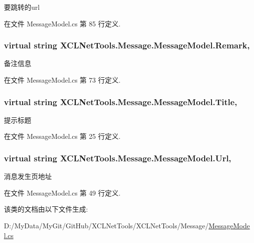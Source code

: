 要跳转的url 



在文件 Message\-Model.\-cs 第 85 行定义.

\hypertarget{class_x_c_l_net_tools_1_1_message_1_1_message_model_a933d98b3a93f2aefeaaf2d66940133a9}{
\subsubsection[{Remark}]{\setlength{\rightskip}{0pt plus 5cm}virtual string X\-C\-L\-Net\-Tools.\-Message.\-Message\-Model.\-Remark\hspace{0.3cm}{\ttfamily [get]}, {\ttfamily [set]}}}\label{class_x_c_l_net_tools_1_1_message_1_1_message_model_a933d98b3a93f2aefeaaf2d66940133a9}


备注信息 



在文件 Message\-Model.\-cs 第 73 行定义.

\hypertarget{class_x_c_l_net_tools_1_1_message_1_1_message_model_a2347b5cf1ac7736de79aa94abd252d85}{
\subsubsection[{Title}]{\setlength{\rightskip}{0pt plus 5cm}virtual string X\-C\-L\-Net\-Tools.\-Message.\-Message\-Model.\-Title\hspace{0.3cm}{\ttfamily [get]}, {\ttfamily [set]}}}\label{class_x_c_l_net_tools_1_1_message_1_1_message_model_a2347b5cf1ac7736de79aa94abd252d85}


提示标题 



在文件 Message\-Model.\-cs 第 25 行定义.

\hypertarget{class_x_c_l_net_tools_1_1_message_1_1_message_model_a35cd14fdd9bbc8dea4c151c00d538755}{
\subsubsection[{Url}]{\setlength{\rightskip}{0pt plus 5cm}virtual string X\-C\-L\-Net\-Tools.\-Message.\-Message\-Model.\-Url\hspace{0.3cm}{\ttfamily [get]}, {\ttfamily [set]}}}\label{class_x_c_l_net_tools_1_1_message_1_1_message_model_a35cd14fdd9bbc8dea4c151c00d538755}


消息发生页地址 



在文件 Message\-Model.\-cs 第 49 行定义.



该类的文档由以下文件生成\-:\begin{DoxyCompactItemize}
\item 
D\-:/\-My\-Data/\-My\-Git/\-Git\-Hub/\-X\-C\-L\-Net\-Tools/\-X\-C\-L\-Net\-Tools/\-Message/\hyperlink{_message_model_8cs}{Message\-Model.\-cs}\end{DoxyCompactItemize}
